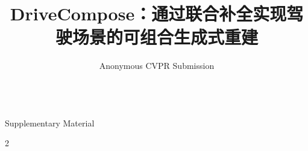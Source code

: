 \documentclass[10pt,twocolumn,letterpaper]{article}
\title{DriveCompose：通过联合补全实现驾驶场景的可组合生成式重建}
\author{Anonymous CVPR Submission}
\begin{document}
\onecolumn
\setcounter{topnumber}{5}
\setcounter{dbltopnumber}{5}
\setcounter{totalnumber}{10}
\renewcommand{\topfraction}{0.9}
\renewcommand{\dbltopfraction}{0.9}
\renewcommand{\textfraction}{0.05}
\renewcommand{\floatpagefraction}{0.75}
\renewcommand{\dblfloatpagefraction}{0.75}
\setrunninglinenumbers
\nolinenumbers
\rightlinenumbers
\setlength{\linenumbersep}{11.5pt}
{\centering\Large
\textbf{\thetitle}\\
\vspace{0.5em}Supplementary Material\\
\vspace{1.0em}\par}
\raggedbottom
\raggedcolumns
\appendix
\renewcommand{\thetable}{S\arabic{table}}
\renewcommand{\theequation}{S\arabic{equation}}
\renewcommand{\thefigure}{S\arabic{figure}}
\linenumbers
\begin{multicols}{2}










{\small


}
\end{multicols}
\end{document}

